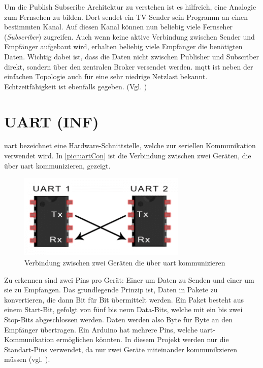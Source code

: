 Um die Publish Subscribe Architektur zu verstehen ist es hilfreich, eine Analogie zum Fernsehen zu bilden. Dort sendet ein TV-Sender sein Programm an einen bestimmten Kanal.
Auf diesen Kanal können nun beliebig viele Fernseher (\textit{Subscriber}) zugreifen. Auch wenn keine aktive Verbindung zwischen Sender und Empfänger aufgebaut wird, erhalten beliebig viele Empfänger die benötigten Daten.
Wichtig dabei ist, dass die Daten nicht zwischen Publisher und Subscriber direkt, sondern über den zentralen Broker versendet werden. \acrshort{mqtt} ist neben der einfachen Topologie auch für eine sehr niedrige Netzlast bekannt. Echtzeitfähigkeit ist ebenfalls gegeben. (Vgl. \cite{mqtt})



\section{UART (INF)}
\label{sec:uart}
\acrfull{uart} bezeichnet eine Hardware-Schnittstelle, welche zur seriellen Kommunikation verwendet wird. In \autoref{pic:uartCon} ist die Verbindung zwischen zwei Geräten, die über \acrshort{uart} kommunizieren, gezeigt.
\begin{figure}[h]
    \begin{center}
        \includegraphics[width=8cm]{uart.PNG}
        \caption{\label{pic:uartCon}Verbindung zwischen zwei Geräten die über \acrshort{uart} kommunizieren}
    \end{center}
\end{figure}
Zu erkennen sind zwei Pins pro Gerät: Einer um Daten zu Senden und einer um sie zu Empfangen. Das grundlegende Prinzip ist, Daten in Pakete zu konvertieren, die dann Bit für Bit übermittelt werden. Ein Paket besteht aus einem Start-Bit, gefolgt von fünf bis neun Data-Bits, welche mit ein bis zwei Stop-Bits abgeschlossen werden. Daten werden also Byte für Byte an den Empfänger übertragen. Ein Arduino hat mehrere Pins, welche \acrshort{uart}-Kommunikation ermöglichen könnten. In diesem Projekt werden nur die Standart-Pins verwendet, da nur zwei Geräte miteinander kommunikzieren müssen (vgl. \cite{uart}). 
\newpage
